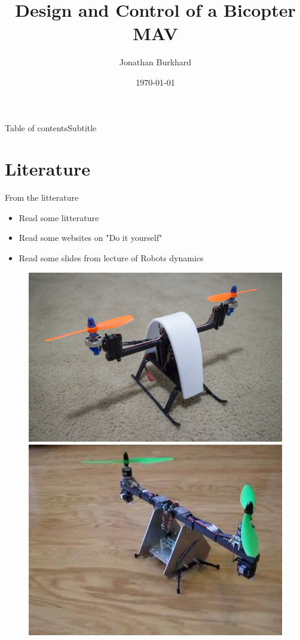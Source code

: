 \documentclass{beamer}
\author{Jonathan Burkhard}
\title{Design and Control of a Bicopter MAV}
\date{\today}
\begin{document}
\frame{\maketitle}
\begin{frame}{Table of contents}{Subtitle}
	\tableofcontents
\end{frame}

\section{Literature}
\begin{frame}{From the litterature}
\begin{itemize}
\item Read some litterature 
\item Read some websites on "Do it yourself"
\item Read some slides from lecture of Robots dynamics
\end{itemize}
\begin{figure}
\includegraphics[scale=0.1]{pictures/bicopter}
\includegraphics[scale=0.2]{pictures/bicopter2}

\end{figure}
\end{frame}
\end{document}
